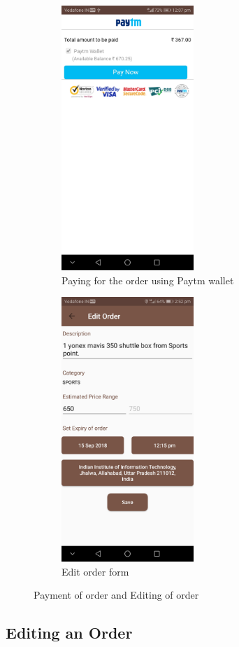 \documentclass{report}
\begin{document}
\begin{figure}[h!]
\begin{subfigure}[h!]{.3\textwidth}
\centering
\includegraphics[width=5cm]{paytm_pay.jpg}
\caption{\centering \tiny Paying for the order using Paytm wallet}
\end{subfigure}
\begin{subfigure}[h!]{.3\textwidth}
\centering
\includegraphics[width=5cm]{edit_order.jpg}
\caption{\centering \tiny Edit order form}
\end{subfigure}
\caption{\tiny Payment of order and Editing of order} 
\label{fig:NASA_Logo}
\end{figure}
\pagebreak
\pagebreak
\subsection{Editing an Order}
\end{document}
